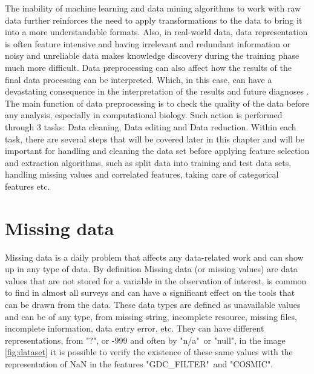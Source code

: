 The inability of machine learning and data mining algorithms to work with raw data further reinforces the need to apply transformations to the data to bring it into a more understandable formats. Also, in real-world data, data representation is often feature intensive and having irrelevant and redundant information or noisy and unreliable data makes knowledge discovery during the training phase much more difficult. Data preprocessing can also affect how the results of the final data processing can be interpreted. Which, in this case, can have a devastating consequence in the interpretation of the results and future diagnoses \cite{Paolo}. The main function of data preprocessing is to check the quality of the data before any analysis\cite{Pyle}, especially in computational biology. Such action is performed through 3 tasks: Data cleaning, Data editing and Data reduction. Within each task, there are several steps that will be covered later in this chapter and will be important for handling and cleaning the data set before applying feature selection and extraction algorithms, such as split data into training and test data sets, handling missing values and correlated features, taking care of categorical features etc.


\section{Missing data} %
\label{sec:missing_data}
\hspace{10px}Missing data is a daily problem that affects any data-related work and can show up in any type of data. By definition Missing data (or missing values) are data values that are not stored for a variable in the observation of interest, is common to find in almost all surveys and can have a significant effect on the tools that can be drawn from the data\cite{Graham}. These data types are defined as unavailable values and can be of any type, from missing string, incomplete resource, missing files, incomplete information, data entry error, etc. They can have different representations, from "?", or -999 and often by "n/a"\ or "null", in the image \ref{fig:dataset} it is possible to verify the existence of these same values with the representation of NaN in the features "GDC\_FILTER"\ and "COSMIC".

